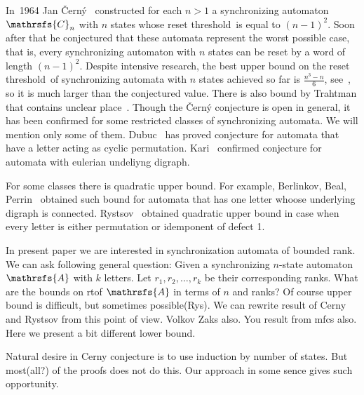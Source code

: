 \documentclass[11pt]{llncs}
\newcommand{\rl}{reset threshold}
\newcommand{\A}{\mathrsfs{A}}
\newcommand{\rt}{rt}
\begin{document}
In~1964 Jan \v{C}ern\'{y}~\cite{Ce64} constructed for each $n>1$ a
synchronizing automaton $\mathrsfs{C}_n$ with $n$ states whose \rl\ is equal to
$(n-1)^2$. Soon after that he conjectured that these automata represent the
worst possible case, that is, every synchronizing automaton with $n$ states can
be reset by a word of length $(n-1)^2$. Despite intensive research, the best
upper bound on the \rl\ of synchronizing automata with $n$ states achieved so
far is $\frac{n^3-n}6$, see~\cite{Pi83}, so it is much larger than the
conjectured value. There is also bound by Trahtman that contains unclear place~\cite{Tr11}.
Though the \v{C}ern\'{y} conjecture is open in general, it
has been confirmed for some restricted classes of synchronizing automata.
We will mention only some of them.
Dubuc~\cite{Du98} has proved conjecture for automata that have a letter acting as cyclic permutation.
Kari~\cite{Ka03} confirmed conjecture for automata with eulerian undeliyng digraph.

For some classes there is quadratic upper bound. For example, Berlinkov, Beal, Perrin~\cite{BBP} obtained
such bound for automata that has one letter whoose underlying digraph is connected.
Rystsov~\cite{Rys} obtained quadratic upper bound in case when every letter is either permutation or
idemponent of defect 1.

In present paper we are interested in synchronization automata of bounded rank.
We can ask following general question: Given a synchronizing $n$-state automaton $\A$
with $k$ letters. Let $r_1, r_2, \ldots, r_k$ be their corresponding ranks. What are the
bounds on \rt of $\A$ in terms of $n$ and ranks?
Of course upper bound is difficult, but sometimes possible(Rys).
We can rewrite result of Cerny and Rystsov from this point of view. Volkov Zaks also.
You result from mfcs also.
Here we present a bit different lower bound.

Natural desire in Cerny conjecture is to use induction by number of states. But most(all?) of the proofs 
does not do this. Our approach in some sence gives such opportunity.
\end{document}
